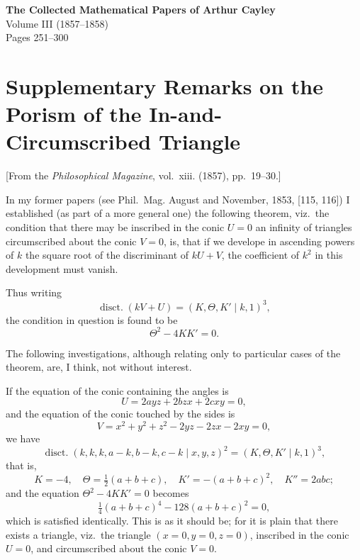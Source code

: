 \documentclass[11pt,a4paper]{article}
\theoremstyle{plain}
\begin{document}
\begin{center}
{\Large\bfseries The Collected Mathematical Papers of Arthur Cayley}\\[1em]
{\large Volume III (1857--1858)}\\[1em]
{\normalsize Pages 251--300}\\[2em]
\end{center}

\tableofcontents
\newpage


\section{Supplementary Remarks on the Porism of the In-and-Circumscribed Triangle}
\label{sec:202}

[From the \textit{Philosophical Magazine}, vol.~xiii. (1857), pp.~19--30.]
\vspace{1em}

In my former papers (see Phil.~Mag. August and November, 1853, [115, 116]) I established (as part of a more general one) the following theorem, viz.\ the condition that there may be inscribed in the conic $U=0$ an infinity of triangles circumscribed about the conic $V=0$, is, that if we develope in ascending powers of $k$ the square root of the discriminant of $kU+V$, the coefficient of $k^2$ in this development must vanish.

Thus writing
\[
\operatorname{disct.} (kV+U) = (K, \Theta, K' \mid k, 1)^3,
\]
the condition in question is found to be
\[
\Theta^2 - 4KK' = 0.
\]

The following investigations, although relating only to particular cases of the theorem, are, I think, not without interest.

If the equation of the conic containing the angles is
\[
U = 2ayz + 2bzx + 2cxy = 0,
\]
and the equation of the conic touched by the sides is
\[
V = x^2 + y^2 + z^2 - 2yz - 2zx - 2xy = 0,
\]
we have
\[
\operatorname{disct.} (k,k,k,a-k,b-k,c-k \mid x,y,z)^2 = (K, \Theta, K' \mid k, 1)^3,
\]
that is,
\[
K = -4, \quad \Theta = \tfrac{1}{2}(a+b+c), \quad K' = -(a+b+c)^2, \quad K'' = 2abc;
\]
and the equation $\Theta^2 - 4KK' = 0$ becomes
\[
\tfrac{1}{4}(a+b+c)^4 - 128(a+b+c)^2 = 0,
\]
which is satisfied identically. This is as it should be; for it is plain that there exists a triangle, viz.\ the triangle $(x=0, y=0, z=0)$, inscribed in the conic $U=0$, and circumscribed about the conic $V=0$.
\end{document}
